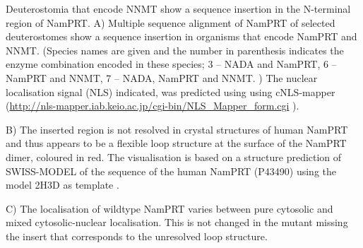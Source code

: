 Deuterostomia that encode NNMT show a sequence insertion in the N-terminal region of NamPRT. A) Multiple sequence alignment of NamPRT of selected deuterostomes show a sequence insertion in organisms that encode NamPRT and NNMT. (Species names are given and the number in parenthesis indicates the enzyme combination encoded in these species; 3 – NADA and NamPRT, 6 – NamPRT and NNMT, 7 – NADA, NamPRT and NNMT. ) The nuclear localisation signal (NLS) indicated, was predicted using using cNLS-mapper (\url{http://nls-mapper.iab.keio.ac.jp/cgi-bin/NLS_Mapper_form.cgi} \cite{Kosugi2009}).

B) The inserted region is not resolved in crystal structures of human NamPRT and thus appears to be a flexible loop structure at the surface of the NamPRT dimer, coloured in red. The visualisation is based on a structure prediction of SWISS-MODEL \cite{Arnold2006; Biasini2014} of the sequence of the human NamPRT (P43490) using the model 2H3D as template \cite{Wang2006}.

C) The localisation of wildtype NamPRT varies between pure cytosolic and mixed cytosolic-nuclear localisation. This is not changed in the mutant missing the insert that corresponds to the unresolved loop structure.
